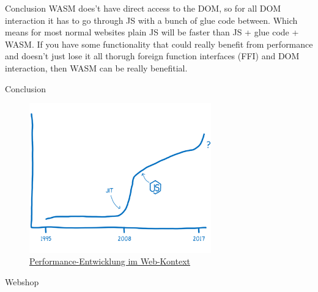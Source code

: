 \documentclass{beamer}
\begin{document}
\begin{frame}{Conclusion}
WASM does't have direct access to the DOM, so for all DOM interaction it has to go through JS with a bunch of glue code between. Which means for most normal websites plain JS will be faster than JS + glue code + WASM. If you have some functionality that could really benefit from performance and doesn't just lose it all thorugh foreign function interfaces (FFI) and DOM interaction, then WASM can be really benefitial.
\end{frame}

\begin{frame}{Conclusion}
    \begin{figure}
        \includegraphics[width=0.7\textwidth,height=0.7\textheight]{./images/perf_history.png}
        \caption{\href{https://hacks.mozilla.org/2017/02/a-cartoon-intro-to-webassembly/}{Performance-Entwicklung im Web-Kontext}}
    \end{figure}
\end{frame}

\begin{frame}{Webshop}

\end{frame}
\end{document}
